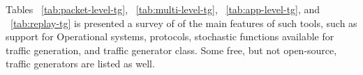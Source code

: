 Tables ~\ref{tab:packet-level-tg}, ~\ref{tab:multi-level-tg}, ~\ref{tab:app-level-tg}, and ~\ref{tab:replay-tg} is presented a survey of of the main features of such tools, such as support for Operational systems, protocols, stochastic functions available for traffic generation, and traffic generator class. Some free, but not open-source, traffic generators are listed as well. 

\begin{table}[]
\centering
\caption{Summary of packet-level traffic generators.}
\end{table}
